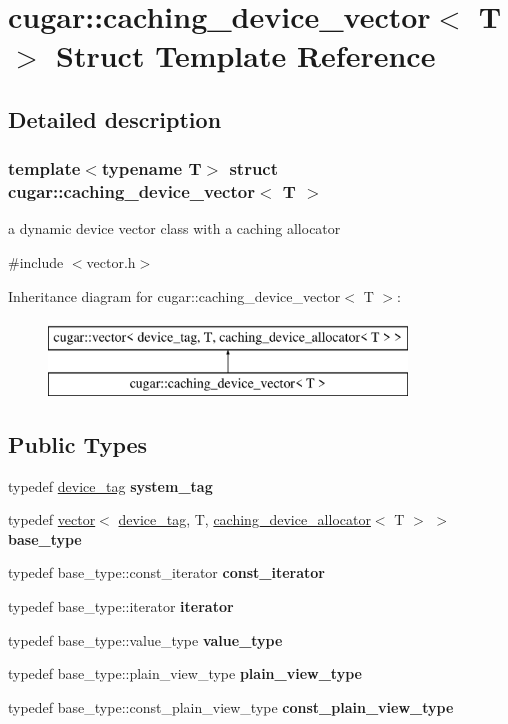 \hypertarget{structcugar_1_1caching__device__vector}{}\section{cugar\+:\+:caching\+\_\+device\+\_\+vector$<$ T $>$ Struct Template Reference}
\label{structcugar_1_1caching__device__vector}


\subsection{Detailed description}
\subsubsection*{template$<$typename T$>$\newline
struct cugar\+::caching\+\_\+device\+\_\+vector$<$ T $>$}

a dynamic device vector class with a caching allocator 

{\ttfamily \#include $<$vector.\+h$>$}

Inheritance diagram for cugar\+:\+:caching\+\_\+device\+\_\+vector$<$ T $>$\+:\begin{figure}[H]
\begin{center}
\leavevmode
\includegraphics[height=2.000000cm]{structcugar_1_1caching__device__vector}
\end{center}
\end{figure}
\subsection*{Public Types}
\begin{DoxyCompactItemize}
\item 
typedef \hyperlink{structcugar_1_1device__tag}{device\+\_\+tag} {\bfseries system\+\_\+tag}
\item 
typedef \hyperlink{structcugar_1_1vector}{vector}$<$ \hyperlink{structcugar_1_1device__tag}{device\+\_\+tag}, T, \hyperlink{structcugar_1_1caching__device__allocator}{caching\+\_\+device\+\_\+allocator}$<$ T $>$ $>$ {\bfseries base\+\_\+type}
\item 
typedef base\+\_\+type\+::const\+\_\+iterator {\bfseries const\+\_\+iterator}
\item 
typedef base\+\_\+type\+::iterator {\bfseries iterator}
\item 
typedef base\+\_\+type\+::value\+\_\+type {\bfseries value\+\_\+type}
\item 
typedef base\+\_\+type\+::plain\+\_\+view\+\_\+type {\bfseries plain\+\_\+view\+\_\+type}
\item 
typedef base\+\_\+type\+::const\+\_\+plain\+\_\+view\+\_\+type {\bfseries const\+\_\+plain\+\_\+view\+\_\+type}
\end{DoxyCompactItemize}
